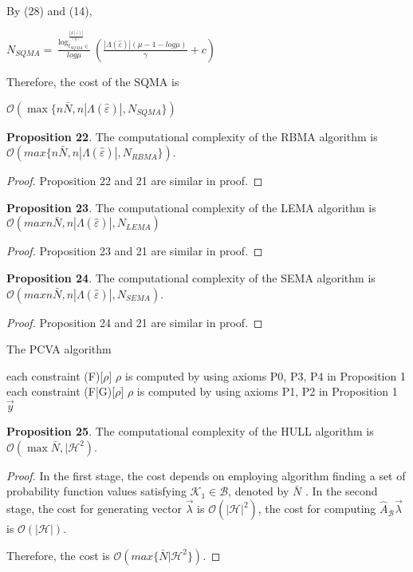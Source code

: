 \documentclass[]{iosart2c}
\begin{document}
  By (28) and (14),

  $N_{SQMA} =  \frac{ \log^{\frac{|\Lambda(\hat{\varepsilon})|}{(0)}}_{t_{SQMA} \in}}{log\mu}  \left( \frac{|\Lambda(\hat{\varepsilon})| (\mu - 1 - log\mu)}{\gamma} + c \right)$

  Therefore, the cost of the SQMA is

  $\mathcal{O}(\max\{n \bar N, n |\Lambda(\hat{\varepsilon})|,N_{SQMA}\})$

  \textbf{Proposition 22}. The computational complexity of the RBMA algorithm is $\mathcal{O}(max\{n \bar N, n |\Lambda(\hat{\varepsilon})|,N_{RBMA}\})$.

  \begin{proof}
    Proposition 22 and 21 are similar in proof.
  \end{proof}

  \textbf{Proposition 23}. The computational complexity of the LEMA algorithm is $\mathcal{O}(max{n \bar N, n |\Lambda(\hat{\varepsilon})|,N_{LEMA}})$

  \begin{proof}
    Proposition 23 and 21 are similar in proof.
  \end{proof}

  \textbf{Proposition 24}. The computational complexity of the
  SEMA algorithm is $\mathcal{O}(max{n \bar N, n |\Lambda(\hat{\varepsilon})|,N_{SEMA}})$.

  \begin{proof}
    Proposition 24 and 21 are similar in proof.
  \end{proof}

  \begin{algorithm}
    \caption{The PCVA algorithm}
    \begin{algorithmic}[1]
      \For
        each constraint (F)[$\rho$]
        \State $\rho$ is computed by using axioms P0, P3, P4 in Proposition 1
      \EndFor
      \For
        each constraint (F|G)[$\rho$]
        \State $\rho$ is computed by using axioms P1, P2 in Proposition 1
      \EndFor
      \State \Return $\vec{y}$
    \end{algorithmic}
  \end{algorithm}

  \textbf{Proposition 25}. The computational complexity of the
  HULL algorithm is $\mathcal{O}(\max{\bar N, |\mathcal{H}^2})$.

  \begin{proof}
    In the first stage, the cost depends on employing algorithm finding a set of probability function
    values satisfying $\mathcal{K}_1 \in \mathcal{B}$, denoted by $\bar N$ . In the
    second stage, the cost for generating vector $\vec{\lambda}$ is
    $\mathcal{O}(|\mathcal{H}|^2)$, the cost for computing $\hat{A}_\mathcal{B}\vec{\lambda}$ is $\mathcal{O}(|\mathcal{H}|)$.

    Therefore, the cost is $\mathcal{O}(max\{\bar N|\mathcal{H}^2\})$.
  \end{proof}
\end{document}
